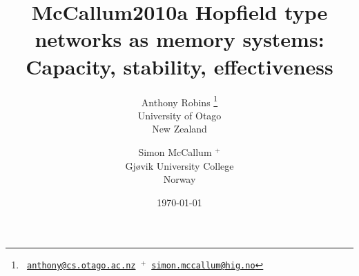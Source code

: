 \documentclass[10pt,a4paper]{article}
\author{\small Anthony Robins \footnote {\texttt{
						\href{mailto:anthony@cs.otago.ac.nz}{anthony@cs.otago.ac.nz}
						\hspace{16mm}$^{+}$~\href{mailto:simon.mccallum@hig.no}{simon.mccallum@hig.no}}}\\
		  \small University of Otago\\
		  \small New Zealand\\
		  \and \small Simon McCallum $^{+}$\\
		  \small Gj\o{}vik University College\\
		  \small Norway}
\date{\small \today}
\begin{document}
         
\title{McCallum2010a Hopfield type networks as memory systems:
			Capacity, stability, effectiveness}
			
\maketitle
\color{black}


%

%



 
\end{document}
